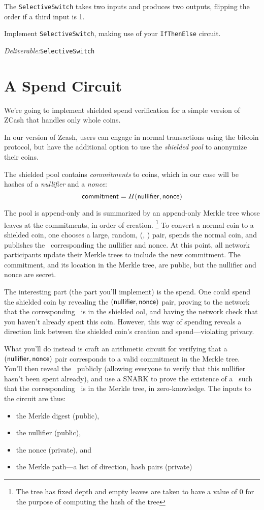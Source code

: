\documentclass[12pt]{article}
\newcommand{\deliverable}[1]{\begin{tcolorbox}[colback=Gold!8]
\emph{Deliverable:}\xspace #1

\end{tcolorbox}}
\begin{document}
The \texttt{SelectiveSwitch} takes two inputs and produces two outputs, flipping
the order if a third input is 1.

Implement \texttt{SelectiveSwitch}, making use of your \texttt{IfThenElse}
circuit.
\deliverable{\texttt{SelectiveSwitch}}

\section{A Spend Circuit}

We're going to implement shielded spend verification for a simple version of
ZCash that handles only whole coins.

In our version of Zcash, users can engage in normal transactions using the
bitcoin protocol, but have the additional option to use the \textit{shielded
pool} to anonymize their coins.

The shielded pool contains \textit{commitments} to coins, which in our case will
be hashes of a \textit{nullifier} and a \textit{nonce}:
\[
  \mathsf{commitment} = H(\mathsf{nullifier}, \mathsf{nonce})
\]

The pool is append-only and is summarized by an append-only Merkle tree whose
leaves at the commitments, in order of creation.%
\footnote{The tree has fixed depth and empty leaves are taken to have a value of
0 for the purpose of computing the hash of the tree}
To convert a normal coin to a shielded coin, one
chooses a large, random, (\nullifier, \nonce) pair, spends the normal coin, and
publishes the \commitment\ corresponding the nullifier and nonce. At this point,
all network participants update their Merkle trees to include the new
commitment. The commitment, and its location in the Merkle tree, are public, but
the nullifier and nonce are secret.

The interesting part (the part you'll implement) is the spend. One could
spend the shielded coin by revealing the $(\mathsf{nullifier}, \mathsf{nonce})$ pair,
proving to the network that the corresponding \commitment\ is in the shielded
ool, and having the network check that you haven't already spent this coin.
However, this way of spending reveals a direction link between the shielded
coin's creation and spend---violating privacy.

What you'll do instead is craft an arithmetic circuit for verifying that a
$(\mathsf{nullifier}, \mathsf{nonce})$ pair corresponds to a valid commitment in the Merkle
tree. You'll then reveal the \nullifier\ publicly (allowing everyone to verify
that this nullifier hasn't been spent already), and use a SNARK to prove the
existence of a \nonce\ such that the corresponding \commitment\ is in the Merkle
tree, in zero-knowledge. The inputs to the circuit are thus:
\begin{itemize}
  \item the Merkle digest (public),
  \item the nullifier (public),
  \item the nonce (private), and
  \item the Merkle path---a list of direction, hash pairs (private)
\end{itemize}
\end{document}
